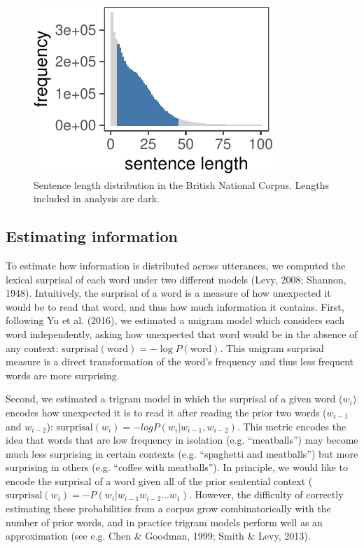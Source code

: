 \documentclass[10pt, letterpaper]{article}
\newenvironment{CodeChunk}{}{}
\begin{document}
\begin{CodeChunk}
\begin{figure}[tb]
\includegraphics{figs/bnc-lengths-1} \caption[Sentence length distribution in the British National Corpus]{Sentence length distribution in the British National Corpus. Lengths included in analysis are dark.}\label{fig:bnc-lengths}
\end{figure}
\end{CodeChunk}

\hypertarget{estimating-information}{%
\subsection{Estimating information}\label{estimating-information}}

To estimate how information is distributed across utterances, we
computed the lexical surprisal of each word under two different models
(Levy, 2008; Shannon, 1948). Intuitively, the surprisal of a word is a
measure of how unexpected it would be to read that word, and thus how
much information it contains. First, following Yu et al. (2016), we
estimated a unigram model which considers each word independently,
asking how unexpected that word would be in the absence of any context:
\(\text{surprisal}(\text{word}) = -\log P(\text{word})\). This unigram
surprisal measure is a direct transformation of the word's frequency and
thus less frequent words are more surprising.

Second, we estimated a trigram model in which the surprisal of a given
word (\(w_i\)) encodes how unexpected it is to read it after reading the
prior two words (\(w_{i-1}\) and \(w_{i-2}\)):
\(\text{surprisal}(w_{i}) = -log P(w_i|w_{i-1},w_{i-2})\). This metric
encodes the idea that words that are low frequency in isolation (e.g.
``meatballs'') may become much less surprising in certain contexts (e.g.
``spaghetti and meatballs'') but more surprising in others (e.g.
``coffee with meatballs''). In principle, we would like to encode the
surprisal of a word given all of the prior sentential context
(\(\text{surprisal}(w_{i}) = -P(w_i|w_{i-1}w_{i-2}...w_{1})\). However,
the difficulty of correctly estimating these probabilities from a corpus
grow combinatorically with the number of prior words, and in practice
trigram models perform well as an approximation (see e.g. Chen \&
Goodman, 1999; Smith \& Levy, 2013).
\end{document}
